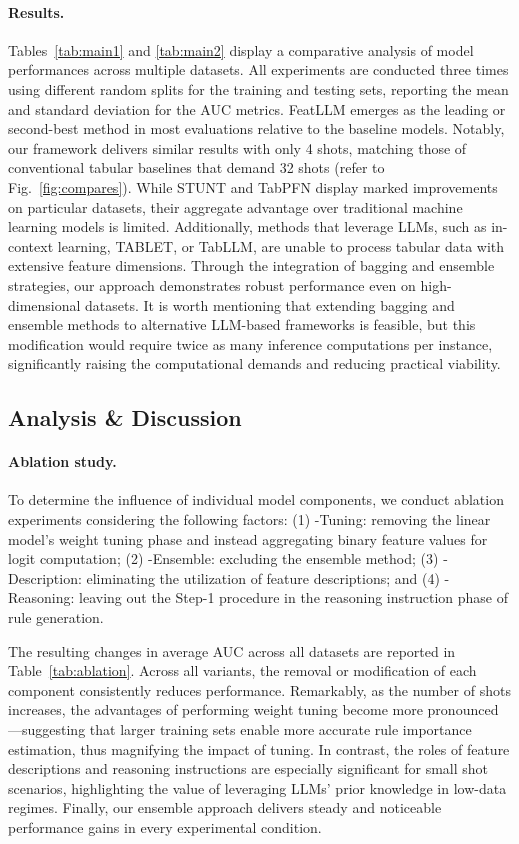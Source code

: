 \vspace*{-0.12in}
\paragraph{Results.}
Tables~\ref{tab:main1} and \ref{tab:main2} display a comparative analysis of model performances across multiple datasets. All experiments are conducted three times using different random splits for the training and testing sets, reporting the mean and standard deviation for the AUC metrics. \textsf{FeatLLM} emerges as the leading or second-best method in most evaluations relative to the baseline models. Notably, our framework delivers similar results with only 4 shots, matching those of conventional tabular baselines that demand 32 shots (refer to Fig.~\ref{fig:compares}). While STUNT and TabPFN display marked improvements on particular datasets, their aggregate advantage over traditional machine learning models is limited. Additionally, methods that leverage LLMs, such as in-context learning, TABLET, or TabLLM, are unable to process tabular data with extensive feature dimensions. Through the integration of bagging and ensemble strategies, our approach demonstrates robust performance even on high-dimensional datasets. It is worth mentioning that extending bagging and ensemble methods to alternative LLM-based frameworks is feasible, but this modification would require twice as many inference computations per instance, significantly raising the computational demands and reducing practical viability.

\subsection{Analysis \& Discussion}
\label{sec:analysis}
\paragraph{Ablation study.} To determine the influence of individual model components, we conduct ablation experiments considering the following factors: (1) \textsf{-Tuning}: removing the linear model’s weight tuning phase and instead aggregating binary feature values for logit computation; (2) \textsf{-Ensemble}: excluding the ensemble method; (3) \textsf{-Description}: eliminating the utilization of feature descriptions; and (4) \textsf{-Reasoning}: leaving out the Step-1 procedure in the reasoning instruction phase of rule generation.

The resulting changes in average AUC across all datasets are reported in Table~\ref{tab:ablation}. Across all variants, the removal or modification of each component consistently reduces performance. Remarkably, as the number of shots increases, the advantages of performing weight tuning become more pronounced—suggesting that larger training sets enable more accurate rule importance estimation, thus magnifying the impact of tuning. In contrast, the roles of feature descriptions and reasoning instructions are especially significant for small shot scenarios, highlighting the value of leveraging LLMs’ prior knowledge in low-data regimes. Finally, our ensemble approach delivers steady and noticeable performance gains in every experimental condition.

